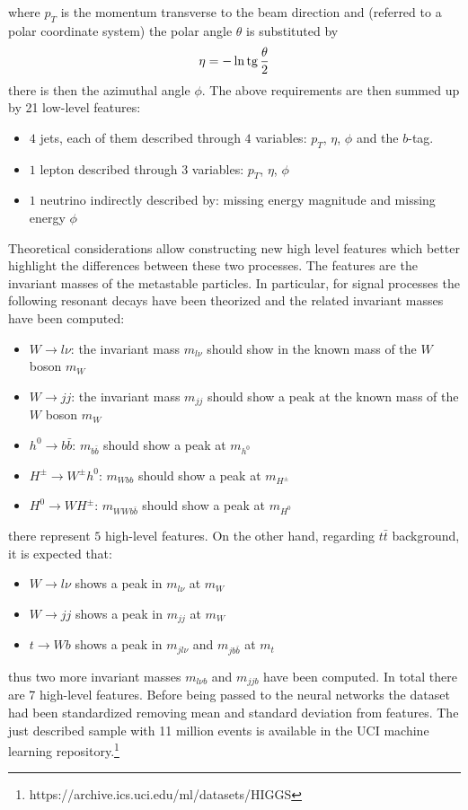 where $p_T$ is the momentum transverse to the beam direction and
(referred to a polar coordinate system) the polar angle $\theta$
is substituted by
\[
 \eta = -\ln{\operatorname{tg}{\frac{\theta}{2}}}
\]
there is then the azimuthal angle $\phi$.
The above requirements are then summed up by 21 low-level features:
\begin{itemize}
 \item $4$ jets, each of them described through $4$ variables: $p_T$,
       $\eta$, $\phi$ and the $b$-tag.
 \item $1$ lepton described through 3 variables: $p_T$, $\eta$, $\phi$
 \item $1$ neutrino indirectly described by: missing energy magnitude and
       missing energy $\phi$
\end{itemize}

Theoretical considerations allow constructing new high level features
which better highlight the differences between these two processes.
The features are the invariant masses of the metastable particles.
In particular, for signal processes the following resonant decays have
been theorized and the related invariant masses have been computed:
\begin{itemize}
 \item $W \rightarrow l \nu$: the invariant mass $m_{l\nu}$ should show
       in the known mass of the $W$ boson $m_W$
 \item $W \rightarrow jj$: the invariant mass $m_{jj}$ should show a peak
       at the known mass of the $W$ boson $m_W$
 \item $h^0 \rightarrow b\bar{b}$: $m_{b\bar{b}}$ should show a peak at
       $m_{h^0}$
 \item $H^\pm \rightarrow W^\pm h^0$: $m_{Wbb}$ should show a peak at
       $m_{H^\pm}$
 \item $H^0 \rightarrow WH^\pm$: $m_{WWb\bar{b}}$ should show a peak at
       $m_{H^0}$
\end{itemize}
there represent $5$ high-level features. On the other hand,
regarding $t\bar{t}$ background, it is expected that:
\begin{itemize}
 \item $W \rightarrow l \nu$ shows a peak in $m_{l\nu}$ at $m_W$
 \item $W \rightarrow jj$ shows a peak in $m_{jj}$ at $m_W$
 \item $t \rightarrow Wb$ shows a peak in $m_{jl\nu}$ and $m_{jb\bar{b}}$ at
       $m_t$
\end{itemize}
thus two more invariant masses $m_{l\nu b}$ and $m_{jjb}$ have been
computed. In total there are 7 high-level features. Before being passed to
the neural networks the dataset had been standardized removing mean and
standard deviation from features. The just described sample with 11 million
events is available in the UCI machine learning
repository.\footnote{https://archive.ics.uci.edu/ml/datasets/HIGGS}



